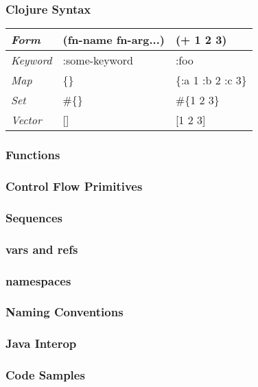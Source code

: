 \documentclass{beamer}
\begin{document}
\begin{frame}
  \frametitle{Clojure Syntax}
  \begin{tabularx}{\textwidth}{ |X|X|X| }
    \hline
    \emph{Form} & (fn-name fn-arg...)  &  (+ 1 2 3) \\ 
    \hline
    \emph{Keyword} & :some-keyword  & :foo \\ 
    \hline
    \emph{Map} &    \{\}  & \{:a 1 :b 2 :c 3\} \\ 
    \hline
    \emph{Set} &    \#\{\} & \#\{1 2 3\} \\ 
    \hline
    \emph{Vector} & []  & [1 2 3] \\
    \hline
  \end{tabularx}
\end{frame}

\begin{frame}
  \frametitle{Functions}
\end{frame}

\begin{frame}
  \frametitle{Control Flow Primitives}
\end{frame}

\begin{frame}
  \frametitle{Sequences}
\end{frame}

\begin{frame}
  \frametitle{vars and refs}
\end{frame}

\begin{frame}
  \frametitle{namespaces}
\end{frame}

\begin{frame}
  \frametitle{Naming Conventions}
\end{frame}

\begin{frame}
  \frametitle{Java Interop}
  
\end{frame}

\begin{frame}
  \frametitle{Code Samples} 
   

\end{frame}  
\end{document}
